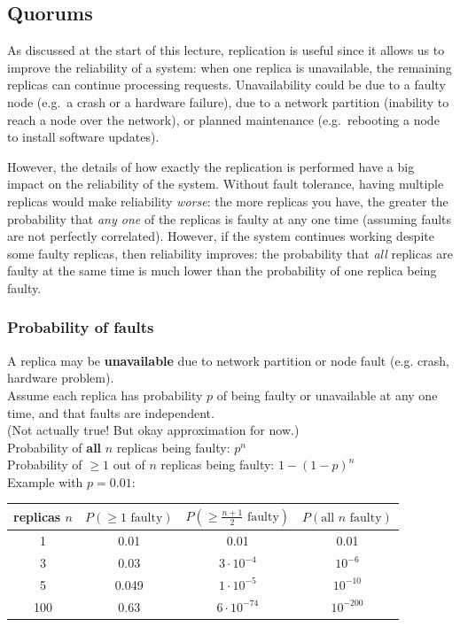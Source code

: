 \subsection{Quorums}\label{sec:quorums}

As discussed at the start of this lecture, replication is useful since it allows us to improve the reliability of a system: when one replica is unavailable, the remaining replicas can continue processing requests.
Unavailability could be due to a faulty node (e.g.\ a crash or a hardware failure), due to a network partition (inability to reach a node over the network), or planned maintenance (e.g.\ rebooting a node to install software updates).

However, the details of how exactly the replication is performed have a big impact on the reliability of the system.
Without fault tolerance, having multiple replicas would make reliability \emph{worse}: the more replicas you have, the greater the probability that \emph{any one} of the replicas is faulty at any one time (assuming faults are not perfectly correlated).
However, if the system continues working despite some faulty replicas, then reliability improves: the probability that \emph{all} replicas are faulty at the same time is much lower than the probability of one replica being faulty.

\begin{frame}
    \label{s:fault-probability}
    \frametitle{Probability of faults}
    A replica may be \textbf{unavailable} due to network partition or node fault (e.g. crash, hardware problem).\\[1em]\pause
    Assume each replica has probability $p$ of being faulty or unavailable at any one time, and that faults are independent.\\
    {\footnotesize (Not actually true! But okay approximation for now.)}\\[1em]\pause
    Probability of \textbf{all} $n$ replicas being faulty: $p^n$\\
    Probability of $\ge 1$ out of $n$ replicas being faulty: $1-(1-p)^n$\\[1em]\pause
    Example with $p=0.01$:\\[0.5em]
    \begin{tabular}{c|c|c|c}
        \hline
        replicas $n$ & $P(\ge 1 \text{ faulty})$ & $P(\ge \frac{n+1}{2}\text{ faulty})$ & $P(\text{all } n \text{ faulty})$ \\\hline
        1 & 0.01 & 0.01 & 0.01 \\
        3 & 0.03 & $3 \cdot 10^{-4}$ & $10^{-6}$ \\
        5 & 0.049 & $1 \cdot 10^{-5}$ & $10^{-10}$ \\
        100 & 0.63 & $6 \cdot 10^{-74}$ & $10^{-200}$ \\\hline
    \end{tabular}
\end{frame}
\label{l:fault-probability}

